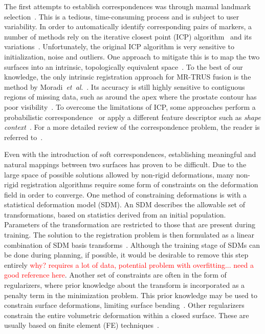 \documentclass[journal]{IEEEtran}
\newcommand{\comment}[1]{\textcolor{red}{#1}}
\begin{document}
The first attempts to establish correspondences was through manual landmark selection~\cite{Cootes95a}. This is a tedious, time-consuming process and is subject to user variability. In order to automatically identify corresponding pairs of markers, a number of methods rely on the iterative closest point (ICP) algorithm~\cite{Besl92a,Zhang94a} and its variations~\cite{Besl92a,Rohr96a,Rucker14a,Zhang94a}. Unfortunately, the original ICP algorithm is very sensitive to initialization, noise and outliers. One approach to mitigate this is to map the two surfaces into an intrinsic, topologically equivalent space~\cite{Huang07a,Yeo10a,Moradi12a}. To the best of our knowledge, the only intrinsic registration approach for MR-TRUS fusion is the method by Moradi~\textit{et~al}.~\cite{Moradi12a}. Its accuracy is still highly sensitive to contiguous regions of missing data, such as around the apex where the prostate contour has poor visibility~\cite{Moradi12a}. To overcome the limitations of ICP, some approaches perform a probabilistic correspondence~\cite{Chui03a,Jian11a,Myronenko10a} or apply a different feature descriptor such as \emph{shape context}~\cite{Belongie02a}. For a more detailed review of the correspondence problem, the reader is referred to~\cite{Kaick11a}.

Even with the introduction of soft correspondences, establishing meaningful and natural mappings between two surfaces has proven to be difficult. Due to the large space of possible solutions allowed by non-rigid deformations, many non-rigid registration algorithms require some form of constraints on the deformation field in order to converge. One method of constraining deformations is with a statistical deformation model (SDM).  An SDM describes the allowable set of transformations, based on statistics derived from an initial population. Parameters of the transformation are restricted to those that are present during training.  The solution to the registration problem is then formulated as a linear combination of SDM basis transforms~\cite{Hu12a,Ashraf02a}. Although the training stage of SDMs can be done during planning, if possible, it would be desirable to remove this step entirely \comment{why?  requires a lot of data, potential problem with overfitting... need a good reference here}. Another set of constraints are often in the form of regularizers, where prior knowledge about the transform is incorporated as a penalty term in the minimization problem. This prior knowledge may be used to constrain surface deformations, limiting surface bending~\cite{Chui03a,Karnik10a,Cerveri14a,Myronenko10a,Huang08a,Sahillioglu12a,Zhang08a,Zheng10a}. Other regularizers constrain the entire volumetric deformation within a closed surface.  These are usually based on finite element (FE) techniques~\cite{Cash05a,Ferrant01a,Moradi12a,Noe10a,Rucker14a,Farheen12a}.
\end{document}
